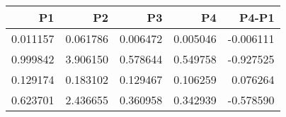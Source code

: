 \begin{tabular}{rrrrr}
\toprule
P1 & P2 & P3 & P4 & P4-P1 \\
\midrule
0.011157 & 0.061786 & 0.006472 & 0.005046 & -0.006111 \\
0.999842 & 3.906150 & 0.578644 & 0.549758 & -0.927525 \\
0.129174 & 0.183102 & 0.129467 & 0.106259 & 0.076264 \\
0.623701 & 2.436655 & 0.360958 & 0.342939 & -0.578590 \\
\bottomrule
\end{tabular}
